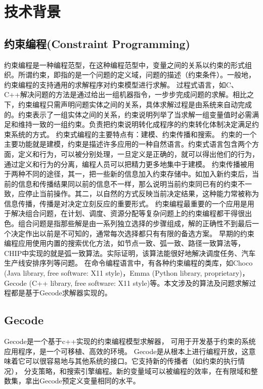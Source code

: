 \documentclass[UTF8]{ctexart}
\begin{document}
\section{技术背景}
\subsection{约束编程(Constraint Programming)}
约束编程是一种编程范型，在这种编程范型中，变量之间的关系以约束的形式组织。所谓约束，即指的是一个问题的定义域，问题的描述（约束条件）。一般地，约束编程的支持通用的求解程序对约束模型进行求解。
过程式语言，如C、C++解决问题的方法是通过给出一组机器指令，一步步完成问题的求解。相比之下，约束编程只需声明问题实体之间的关系，具体求解过程是由系统来自动完成的。约束表示了一组实体之间的关系，约束说明列举了当求解一组变量值时必需满足和维持一致的一组约束。负责把约束说明转化成程序的约束转化体制决定满足约束系统的方式。
约束式编程的主要特点有：建模、约束传播和搜索。
约束的一个主要功能就是建模，约束是描述许多应用的一种自然语言。约束式语言包含两个方面，定义和行为，可以被分别处理，一旦定义是正确的，就可以得出他们的行为，通过定义和行为的分离，编程人员可以把精力更多地集中于建模。 
 约束传播被用于两种不同的途径，其一，把一些新的信息加入约束存储中。如加入新约束后，当前的信息和传播结果同以前的信息不一样，那么说明当前约束同已有的约束不一致，应停止当前操作。其二，以自然的方式反映当前决定结果，这种能力常被称为信息传播，传播是对决定立刻反应的重要形式。
约束编程最重要的一个应用是用于解决组合问题，在计划、调度、资源分配等复杂问题上的约束编程都干得很出色。组合问题是指那些解是由一系列独立选择的步骤组成，解的正确性不到最后一个决定作出以前是不可知的，通常每次选择都只有有限的备选方案。
 早期的约束编程应用使用内置的搜索优化方法，如节点一致、弧一致、路径一致算法等，CHIP中实现的就是弧一致算法。实际证明，该算法能很好地解决调度任务、汽车生产线安排序列等问题。
在命令编程语言中，有各种约束编程的类库，如Choco (Java library, free software: X11 style)，Emma (Python library, proprietary)，Gecode (C++ library, free software: X11 style)等。本文涉及的算法及问题求解过程都是基于Gecode求解器实现的。
\subsection{Gecode}
Gecode\cite{gecode}是一个基于c++实现的约束编程模型求解器，
可用于开发基于约束的系统应用程序，是一个可移植、高效的环境。 Gecode是从根本上进行编程开放，这意味着它可以很容易地与其他系统的接口。它支持新的传播者（如约束的执行情况），
分支策略，和搜索引擎编程。新的变量域可以被编程的效率，在有限域和整数集，拿出Gecode预定义变量相同的水平。
\end{document}
